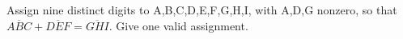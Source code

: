 Assign nine distinct digits to A,B,C,D,E,F,G,H,I, with A,D,G nonzero, so that $\overline{ABC}+\overline{DEF}=\overline{GHI}$. Give one valid assignment.
